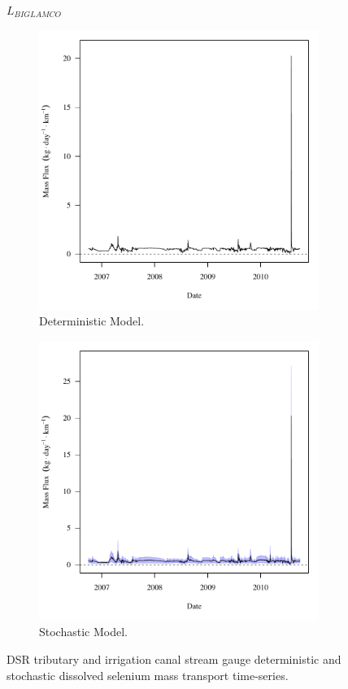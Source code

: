 \subfiguremid
\begin{landscape}
	\begin{figure}
		$ \displaystyle L_{BIGLAMCO} $
		\begin{subfigure}{0.7\textwidth}
			\centering
			\includegraphics[width=\tableCustomSize]{"Figures/Results_DSR/Deterministic/f BIG"}
			\caption{Deterministic Model.}
		\end{subfigure}%
		\begin{subfigure}{0.7\textwidth}
			\centering
			\includegraphics[width=\tableCustomSize]{"Figures/Results_DSR/Stochastic/f BIG"}
			\caption{Stochastic Model.}
		\end{subfigure}
		\caption{DSR tributary and irrigation canal stream gauge deterministic and stochastic dissolved selenium mass transport time-series.}
	\end{figure}
\end{landscape}
